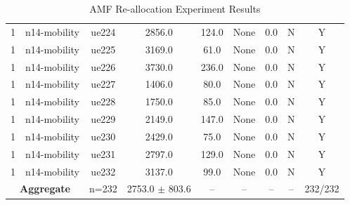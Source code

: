 \begin{table}[ht]
\begin{tabular}{|c|c|c|c|c|c|c|c|c|}
1 & n14-mobility & ue224 & 2856.0 & 124.0 & None & 0.0 & N & Y \\
1 & n14-mobility & ue225 & 3169.0 & 61.0 & None & 0.0 & N & Y \\
1 & n14-mobility & ue226 & 3730.0 & 236.0 & None & 0.0 & N & Y \\
1 & n14-mobility & ue227 & 1406.0 & 80.0 & None & 0.0 & N & Y \\
1 & n14-mobility & ue228 & 1750.0 & 85.0 & None & 0.0 & N & Y \\
1 & n14-mobility & ue229 & 2149.0 & 147.0 & None & 0.0 & N & Y \\
1 & n14-mobility & ue230 & 2429.0 & 75.0 & None & 0.0 & N & Y \\
1 & n14-mobility & ue231 & 2797.0 & 129.0 & None & 0.0 & N & Y \\
1 & n14-mobility & ue232 & 3137.0 & 99.0 & None & 0.0 & N & Y \\
\multicolumn{2}{|c|}{\textbf{Aggregate}} & n=232 & 2753.0 $\pm$ 803.6 & -- & -- & -- & -- & 232/232 \\
\hline
\end{tabular}
\caption{AMF Re-allocation Experiment Results}
\label{tab:amf_realloc}
\end{table}
